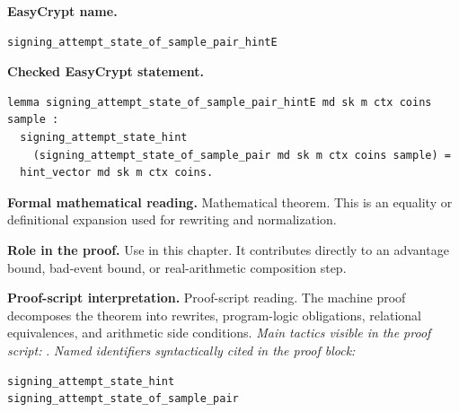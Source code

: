 \begin{formaltheorem}
\noindent\textbf{EasyCrypt name.}
\begin{lstlisting}[language=EasyCrypt,basicstyle=\ttfamily\scriptsize]
signing_attempt_state_of_sample_pair_hintE
\end{lstlisting}
\noindent\textbf{Checked EasyCrypt statement.}
\begin{lstlisting}[language=EasyCrypt,basicstyle=\ttfamily\scriptsize]
lemma signing_attempt_state_of_sample_pair_hintE md sk m ctx coins sample :
  signing_attempt_state_hint
    (signing_attempt_state_of_sample_pair md sk m ctx coins sample) =
  hint_vector md sk m ctx coins.
\end{lstlisting}
\noindent\textbf{Formal mathematical reading.}
Mathematical theorem. This is an equality or definitional expansion used for rewriting and normalization.

\noindent\textbf{Role in the proof.}
Use in this chapter. It contributes directly to an advantage bound, bad-event bound, or real-arithmetic composition step.

\noindent\textbf{Proof-script interpretation.}
Proof-script reading. The machine proof decomposes the theorem into rewrites, program-logic obligations, relational equivalences, and arithmetic side conditions.
\emph{Main tactics visible in the proof script:} .
\emph{Named identifiers syntactically cited in the proof block:}
\begin{lstlisting}[language=EasyCrypt,basicstyle=\ttfamily\scriptsize]
signing_attempt_state_hint
signing_attempt_state_of_sample_pair
\end{lstlisting}

\end{formaltheorem}

